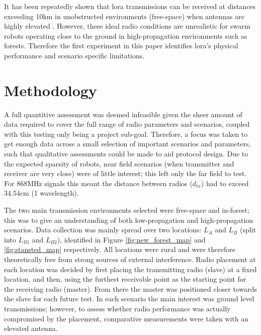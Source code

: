 It has been repeatedly shown that \ac{lora} transmissions can be received at distances exceeding 10km in  unobstructed environments (free-space) when antennas are highly elevated \cite{3YP:LORA_RANGE_REVIEW}. However, these ideal radio conditions are unrealistic for swarm robots operating close to the ground in high-propagation environments such as forests. Therefore the first experiment in this paper identifies \ac{lora}'s physical performance and scenario specific limitations. 

\section{Methodology}
A full quantitive assessment was deemed infeasible given the sheer amount of data required to cover the full range of radio parameters and scenarios, coupled with this testing only being a project sub-goal. Therefore, a focus was taken to get enough data across a small selection of important scenarios and parameters, such that qualitative assessments could be made to aid protocol design. Due to the expected sparsity of robots, near field scenarios (when transmitter and receiver are very close) were of little interest; this left only the far field to test. For 868MHz signals this meant the distance between radios ($d_{tx}$) had to exceed 34.54cm (1 wavelength). 

 The two main transmission environments selected were free-space and in-forest; this was to give an understanding of both low-propagation and high-propagation scenarios. Data collection was mainly spread over two locations: \textbf{$L_{A}$} and \textbf{$L_{B}$} (split into \textbf{$L_{B1}$} and \textbf{$L_{B2}$}), identified in Figure \ref{fig:new_forest_map} and \ref{fig:stansted_map} respectively. All locations were rural and were therefore theoretically free from strong sources of external interference. Radio placement at each location was decided by first placing the transmitting radio (slave) at a fixed location, and then, using the furthest receivable point as the starting point for the receiving radio (master). From there the master was positioned closer towards the slave for each future test. In each scenario the main interest was ground level transmissions; however, to assess whether radio performance was actually compromised by the placement, comparative measurements were taken with an elevated antenna. 
 

